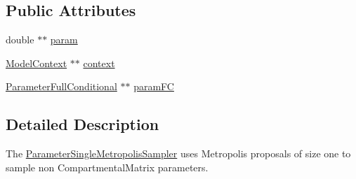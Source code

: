 \subsection*{Public Attributes}
\begin{DoxyCompactItemize}
\item 
double $\ast$$\ast$ \hyperlink{classSpatialSEIR_1_1ParameterSingleMetropolisSampler_a285f57aeb99f88605992bf25c9f38afb}{param}
\item 
\hyperlink{classSpatialSEIR_1_1ModelContext}{Model\-Context} $\ast$$\ast$ \hyperlink{classSpatialSEIR_1_1ParameterSingleMetropolisSampler_a4d66150fbe87614f62924200850ceb8d}{context}
\item 
\hyperlink{classSpatialSEIR_1_1ParameterFullConditional}{Parameter\-Full\-Conditional} $\ast$$\ast$ \hyperlink{classSpatialSEIR_1_1ParameterSingleMetropolisSampler_afa10a884a3c6772dfca224f058293dfd}{param\-F\-C}
\end{DoxyCompactItemize}


\subsection{Detailed Description}
The \hyperlink{classSpatialSEIR_1_1ParameterSingleMetropolisSampler}{Parameter\-Single\-Metropolis\-Sampler} uses Metropolis proposals of size one to sample non Compartmental\-Matrix parameters. 

